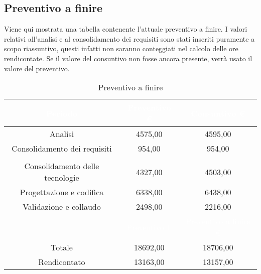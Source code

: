 \subsection{Preventivo a finire}\label{Paf}
Viene qui mostrata una tabella contenente l'attuale preventivo a finire. I valori relativi all'analisi e al consolidamento dei requisiti sono stati inseriti puramente a scopo riassuntivo, questi infatti non saranno conteggiati nel calcolo delle ore rendicontate. Se il valore del consuntivo non fosse ancora presente, verrà usato il valore del preventivo.
\begin{table}[H]
	\centering
	\begin{tabular}{|c|c|c|}
		\rowcolor{darkblue} 
		\textcolor{white}{Periodo}		&\textcolor{white}{Preventivo €}&	\textcolor{white}{Consuntivo €}\\ \hline
		Analisi							&	4575,00						&	4595,00 \\ \hline
		Consolidamento dei requisiti	&	954,00						&	954,00 \\ \hline
		\rowcolor{darkblue} \multicolumn{3}{|c|}{\textcolor{white}{Rendicontato}}\\ \hline
		Consolidamento delle tecnologie	&	4327,00						&	4503,00 \\ \hline
		Progettazione e codifica		&	6338,00						&	6438,00 \\ \hline
		Validazione e collaudo			&	2498,00						&	2216,00 \\ \hline
		\rowcolor{darkblue}				&\textcolor{white}{Preventivo €}&	\textcolor{white}{Preventivo a finire €}\\ \hline
		Totale							&	18692,00					&	18706,00 \\ \hline
		Rendicontato					&	13163,00					&	13157,00 \\ \hline
	\end{tabular}
	\caption{Preventivo a finire}
\end{table}